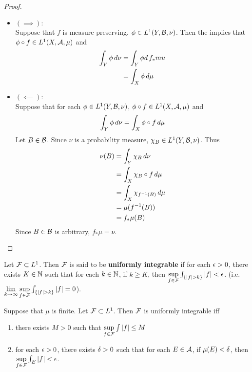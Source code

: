 \documentclass{book}
\begin{document}
	\begin{proof}\
		\begin{itemize}
			\item $(\implies)$: \\
			Suppose that $f$ is measure preserving. $\phi \in L^1(Y, \mathcal{B}, \nu)$. Then the  implies that $\phi \circ f \in L^1(X, \mathcal{A}, \mu)$ and 
			\begin{align*}
				\int_Y \phi \, d \nu 
				& = \int_Y \phi d \, f_* mu \\
				& = \int_X \phi \, d \mu \\
			\end{align*} 
			\item $(\impliedby)$: \\
			Suppose that for each $\phi \in L^1(Y, \mathcal{B}, \nu)$, $\phi \circ f \in L^1(X, \mathcal{A}, \mu)$ and 
			$$\int_Y \phi \, d \nu = \int_X \phi \circ f \, d \mu $$
			Let $B \in \mathcal{B}$. Since $\nu$ is a probability measure, $\chi_B \in L^1(Y, \mathcal{B}, \nu)$. Thus 
			\begin{align*}
				\nu(B)
				& = \int_Y \chi_B \, d \nu \\
				& = \int_X \chi_B \circ f \, d \mu \\
				& = \int_X \chi_{f^{-1}(B)} \, d \mu \\
				& = \mu(f^{-1}(B)) \\
				& = f_*\mu(B)
			\end{align*}
			Since $B \in \mathcal{B}$ is arbitrary, $f_* \mu = \nu$. 
		\end{itemize}
	\end{proof}
	
	\begin{defn}  
		Let $\mathcal{F} \subset L^1$. Then $\mathcal{F}$ is said to be \textbf{uniformly integrable} if for each $\epsilon >0$, there exists $K \in \mathbb{N}$ such that for each $k \in \mathbb{N}$, if $k \geq K$, then $\sup\limits_{f \in \MF} \int_{\{|f|>k\}}|f| < \ep$. (i.e. $\lim\limits_{k \rightarrow \infty} \sup\limits_{f \in \mathcal{F}} \int_{\{|f| > k\}} |f| = 0$).
	\end{defn}
	
	\begin{ex}  
		Suppose that $\mu$ is finite. Let $\mathcal{F} \subset L^1$. Then $\mathcal{F}$ is uniformly integrable iff 
		\begin{enumerate}
			\item there exists $M >0$ such that $\sup\limits_{f \in \mathcal{F}}\int |f| \leq M$
			\item for each $\epsilon >0$, there exists $\delta >0$ such that for each $E \in \mathcal{A}$, if $\mu(E) < \delta$, then $\sup\limits_{f \in \mathcal{F}} \int_E |f| < \epsilon$.
		\end{enumerate}
	\end{ex}
	
\end{document}
